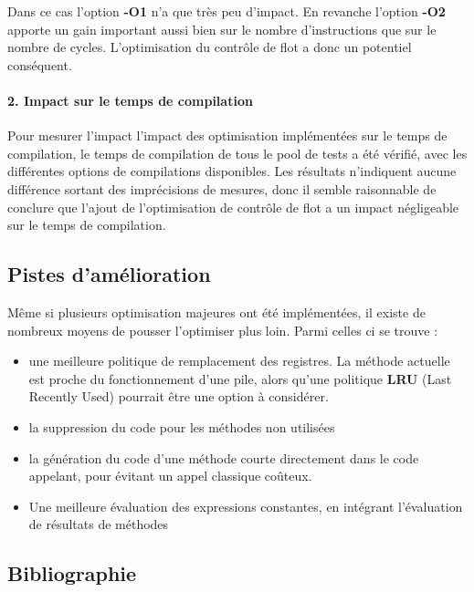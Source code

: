 \documentclass[
]{article}
\begin{document}
Dans ce cas l'option \textbf{-O1} n'a que très peu d'impact. En revanche
l'option \textbf{-O2} apporte un gain important aussi bien sur le nombre
d'instructions que sur le nombre de cycles. L'optimisation du contrôle
de flot a donc un potentiel conséquent.

\hypertarget{2-impact-sur-le-temps-de-compilation}{%
\paragraph{2. Impact sur le temps de
compilation}\label{2-impact-sur-le-temps-de-compilation}}

Pour mesurer l'impact l'impact des optimisation implémentées sur le
temps de compilation, le temps de compilation de tous le pool de tests a
été vérifié, avec les différentes options de compilations disponibles.
Les résultats n'indiquent aucune différence sortant des imprécisions de
mesures, donc il semble raisonnable de conclure que l'ajout de
l'optimisation de contrôle de flot a un impact négligeable sur le temps
de compilation.

\hypertarget{pistes-damuxe9lioration}{%
\subsection{Pistes d'amélioration}\label{pistes-damuxe9lioration}}

Même si plusieurs optimisation majeures ont été implémentées, il existe
de nombreux moyens de pousser l'optimiser plus loin. Parmi celles ci se
trouve :

\begin{itemize}
\item
  une meilleure politique de remplacement des registres. La méthode
  actuelle est proche du fonctionnement d'une pile, alors qu'une
  politique \textbf{LRU} (Last Recently Used) pourrait être une option à
  considérer.
\item
  la suppression du code pour les méthodes non utilisées
\item
  la génération du code d'une méthode courte directement dans le code
  appelant, pour évitant un appel classique coûteux.
\item
  Une meilleure évaluation des expressions constantes, en intégrant
  l'évaluation de résultats de méthodes
\end{itemize}

\hypertarget{bibliographie}{%
\subsection{Bibliographie}\label{bibliographie}}
\end{document}
